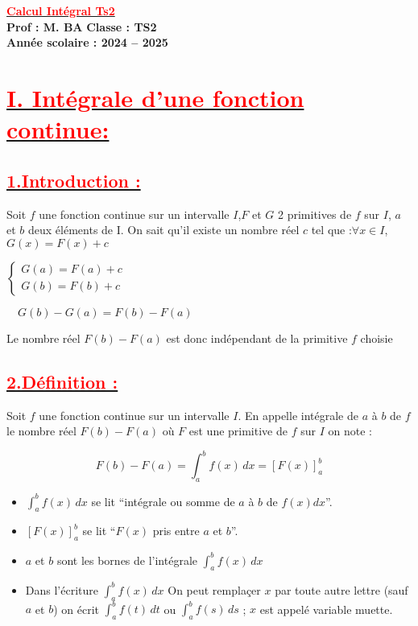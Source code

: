 \documentclass[12pt,a4paper]{article}
\begin{document}
\begin{center}
    \Large\textbf{\underline{\textcolor{red}{Calcul Intégral Ts2}}}\\[-0.1cm]
    \normalsize\textbf{Prof : M. BA} \hfill \textbf{Classe : TS2}\\[-0.1cm]
    \textbf{Année scolaire : 2024 -- 2025}
\end{center}

\section*{\underline{\textbf{\textcolor{red}{I. Intégrale d'une fonction continue: }}}}
\subsection*{\underline{\textbf{\textcolor{red}{1.Introduction :}}}}

Soit \( f \) une fonction continue sur un intervalle \( I \),\( F \) et \( G \) 2 primitives de \( f \) sur \( I \), \( a \) et \( b  \) deux éléments de I. On sait qu'il existe un nombre réel $c$ tel que :$\forall x\in I$, 
 \( G(x) = F(x) + c \)

\underline{\( 
\begin{cases}
G(a) = F(a) + c\\
G(b) = F(b) + c
\end{cases}
\)}

\(
\quad G(b) - G(a) = F(b) - F(a)
\)

Le nombre réel \( F(b) - F(a) \) est donc indépendant de la primitive \( f \) choisie

\subsection*{\underline{\textbf{\textcolor{red}{2.Définition :}}}}

Soit \( f \) une fonction continue sur un intervalle \( I \).
En appelle intégrale de \( a \) à \( b \) de \( f \) le nombre réel \( F(b) - F(a) \) où \( F \) est une primitive de \( f \) sur \( I \) on note :

\[
F(b) - F(a) = \int_{a}^{b} f(x) \, dx = \left[ F(x) \right]_{a}^{b}
\]

\begin{itemize}
    \item \( \int_a^b f(x) \, dx \) se lit ``intégrale ou somme  de $a$ à $b$ de $f(x)dx$''.
    \item \( \left[ F(x) \right]_a^b \) se lit ``\( F(x) \) pris entre \( a \) et \( b \)''.
    \item \( a \) et \( b \) sont les bornes de l'intégrale \( \int_a^b f(x) \, dx \)
        \item Dans l'écriture \( \int_a^b f(x) \, dx \) On peut remplaçer \( x \) par toute autre lettre (sauf \( a \) et \( b \)) on écrit \( \int_a^b f(t) \, dt \) ou \( \int_a^b f(s) \, ds \) ; \( x \) est appelé variable muette.
\end{itemize}
\newpage
\end{document}
